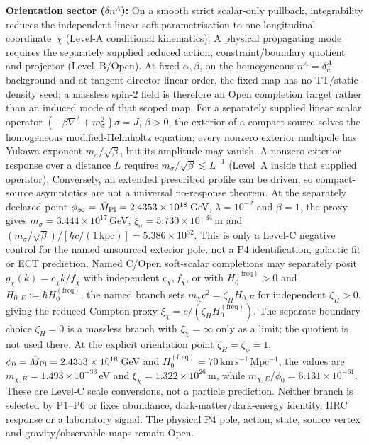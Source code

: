\documentclass[11pt,a4paper]{article}
\begin{document}
\textbf{Orientation sector ($\delta n^A$):} On a smooth strict scalar-only
pullback, integrability reduces the independent linear soft parametrisation to
one longitudinal coordinate~$\chi$ (Level-A conditional kinematics).  A
physical propagating mode requires the separately supplied reduced action,
constraint/boundary quotient and projector (Level~B/Open).  At fixed
$\alpha,\beta$, on the homogeneous $\bar n^A=\delta^A_w$ background and at
tangent-director linear order, the fixed map has no TT/static-density seed;
a massless spin-2 field is therefore an Open completion target rather than
an induced mode of that scoped map.  For a separately supplied linear scalar operator
$(-\beta\nabla^2+m_\sigma^2)\sigma=J$, $\beta>0$, the exterior of a compact
source solves the homogeneous modified-Helmholtz equation; every nonzero
exterior multipole has Yukawa exponent $m_\sigma/\sqrt\beta$, but its amplitude
may vanish.  A nonzero exterior response over a distance $L$ requires
$m_\sigma/\sqrt\beta\lesssim L^{-1}$ (Level~A inside that supplied operator).
Conversely, an extended prescribed profile can be driven, so compact-source
asymptotics are not a universal no-response theorem.  At the separately
declared point $\phi_\infty=\bar M_{\rm Pl}=2.4353\times10^{18}$\,GeV,
$\lambda=10^{-2}$ and $\beta=1$, the proxy gives
$m_\sigma=3.444\times10^{17}$\,GeV,
$\xi_\sigma=5.730\times10^{-34}$\,m and
$(m_\sigma/\sqrt\beta)/[\hbar c/(1\,\mathrm{kpc})]
=5.386\times10^{52}$.  This is only a Level-C negative control for the
named unsourced exterior pole, not a P4 identification, galactic fit or ECT
prediction.  Named C/Open soft-scalar completions may separately posit
$g_\chi(k)=c_\chi k/f_\chi$ with independent $c_\chi,f_\chi$, or
with $H_0^{(\mathrm{freq})}>0$ and
$H_{0,E}:=\hbar H_0^{(\mathrm{freq})}$, the named branch sets
$m_\chi c^2=\zeta_HH_{0,E}$ for independent $\zeta_H>0$, giving the reduced
Compton proxy $\xi_\chi=c/(\zeta_HH_0^{(\mathrm{freq})})$.  The separate
boundary choice $\zeta_H=0$ is a massless branch with $\xi_\chi=\infty$ only
as a limit; the quotient is not used there.  At the explicit orientation
point $\zeta_H=\zeta_\phi=1$,
$\phi_0=\bar M_{\rm Pl}=2.4353\times10^{18}$\,GeV and
$H_0^{(\mathrm{freq})}=70\,\mathrm{km\,s^{-1}\,Mpc^{-1}}$, the values are
$m_{\chi,E}=1.493\times10^{-33}$\,eV and
$\xi_\chi=1.322\times10^{26}$\,m, while
$m_{\chi,E}/\phi_0=6.131\times10^{-61}$.  These are Level-C scale
conversions, not a particle prediction.  Neither branch is selected by P1--P6 or fixes
abundance, dark-matter/dark-energy identity, HRC response or a laboratory
signal.  The physical P4 pole, action, state, source vertex and
gravity/observable maps remain Open.
\end{document}
